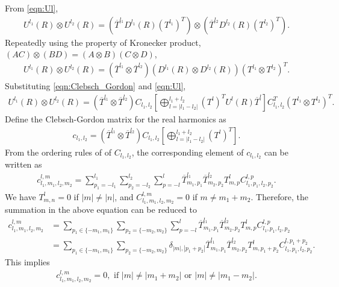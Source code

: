 \documentclass[onecolumn,11pt]{IEEEtran}
\newcommand{\bracket}[1]{\ensuremath{\left[ #1 \right]}}
\begin{document}
From \eqref{eqn:Ul},
\begin{align*}
    U^{l_1}(R) \otimes U^{l_2}(R) = (\overline{T}^{l_1} D^{l_1}(R) (T^{l_1})^T) \otimes (\overline{T}^{l_2} D^{l_2}(R) (T^{l_2})^T) .
\end{align*}
Repeatedly using the property of Kronecker product, $(AC)\otimes (BD) = (A\otimes B)(C \otimes D)$, 
\begin{align*}
    U^{l_1}(R) \otimes U^{l_2}(R) = (\overline{T}^{l_1} \otimes \overline{T}^{l_2}) (D^{l_1}(R) \otimes D^{l_2}(R)) (T^{l_1} \otimes   T^{l_2})^T .
\end{align*}
Substituting \eqref{eqn:Clebsch_Gordon} and \eqref{eqn:Ul},
\begin{align*}
    U^{l_1}(R) \otimes U^{l_2}(R) = (\overline{T}^{l_1} \otimes \overline{T}^{l_2}) C_{l_1,l_2} \bracket{ \bigoplus_{l=|l_1-l_2|}^{l_1+l_2} (T^l)^T U^l(R) \overline{T}^l } C_{l_1,l_2}^T (T^{l_1} \otimes   T^{l_2})^T .
\end{align*}
Define the Clebsch-Gordon matrix for the real harmonics as
\begin{align}
    c_{l_1,l_2} = (\overline{T}^{l_1} \otimes \overline{T}^{l_2}) C_{l_1,l_2} \bracket{ \bigoplus_{l=|l_1-l_2|}^{l_1+l_2} (T^l)^T }.
\end{align}
From the ordering rules of of $C_{l_1,l_2}$, the corresponding element of $c_{l_1,l_2}$ can be written as
\begin{align}
    c^{l,m}_{l_1,m_1,l_2,m_2} = \sum_{p_1=-l_1}^{l_1} \sum_{p_2 = -l_2}^{l_2} \sum_{p=-l}^l \overline T^{l_1}_{m_1,p_1} \overline T^{l_2}_{m_2,p_2} T^l_{m,p} C^{l,p}_{l_1,p_1,l_2,p_2}.
\end{align}
We have $T^l_{m,n}=0$ if $|m|\neq|n|$, and $C^{l,m}_{l_1,m_1,l_2,m_2}=0$ if $m\neq m_1+m_2$. 
Therefore, the summation in the above equation can be reduced to
\begin{align}
    c^{l,m}_{l_1,m_1,l_2,m_2} & = \sum_{p_1\in\{-m_1,m_1\}} \sum_{p_2 =\{ -m_2,m_2\}} \sum_{p=-l}^l \overline T^{l_1}_{m_1,p_1} \overline T^{l_2}_{m_2,p_2} T^l_{m,p} C^{l,p}_{l_1,p_1,l_2,p_2}\\
                              & = \sum_{p_1\in\{-m_1,m_1\}} \sum_{p_2 =\{ -m_2,m_2\}} \delta_{|m|,|p_1+p_2|} \overline T^{l_1}_{m_1,p_1} \overline T^{l_2}_{m_2,p_2} T^l_{m,p_1+p_2} C^{l,p_1+p_2}_{l_1,p_1,l_2,p_2}.
\end{align}
This implies
\begin{align}
    c^{l,m}_{l_1,m_1,l_2,m_2} = 0, \text{ if  $|m|\neq |m_1+m_2|$ or $|m|\neq |m_1-m_2|$}.\label{eqn:c_lm_zero}
\end{align}
\end{document}
